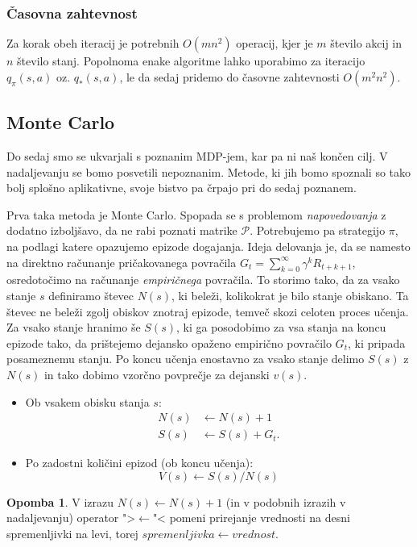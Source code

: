 \documentclass[12pt,a4paper]{amsart}
\theoremstyle{definition} %
\newtheorem{opomba}[definicija]{Opomba}
\theoremstyle{plain} %
\begin{document}
\subsubsection{Časovna zahtevnost}
Za korak obeh iteracij je potrebnih $O(mn^2)$ operacij, kjer je $m$ število akcij in $n$ število 
stanj. Popolnoma enake algoritme lahko uporabimo za iteracijo $q_\pi(s, a)$ oz. $q_*(s, a)$, le 
da sedaj pridemo do časovne zahtevnosti $O(m^2n^2)$.

\subsection{Monte Carlo}
Do sedaj smo se ukvarjali s poznanim MDP-jem, kar pa ni naš končen cilj. V nadaljevanju se bomo 
posvetili nepoznanim. Metode, ki jih bomo spoznali so tako bolj splošno aplikativne, svoje 
bistvo pa črpajo pri do sedaj poznanem.

Prva taka metoda je Monte Carlo. Spopada se s problemom \textit{napovedovanja} z dodatno izboljšavo, 
da ne rabi poznati matrike $\mathcal{P}$. Potrebujemo pa strategijo $\pi$, na podlagi katere opazujemo
epizode dogajanja. Ideja delovanja je, da se namesto na direktno računanje pričakovanega povračila
$G_t = \sum_{k=0}^\infty \gamma^k R_{t + k + 1}$, osredotočimo na računanje \textit{empiričnega} 
povračila. To storimo tako, da za vsako stanje $s$ definiramo števec $N(s)$, ki beleži, kolikokrat 
je bilo stanje obiskano. Ta števec ne beleži zgolj obiskov znotraj epizode, temveč skozi celoten 
proces učenja. Za vsako stanje hranimo še $S(s)$, ki ga posodobimo za vsa stanja na koncu epizode
tako, da prištejemo dejansko opaženo empirično povračilo $G_t$, ki pripada posameznemu stanju.
Po koncu učenja enostavno za vsako stanje delimo $S(s)$ z $N(s)$ in tako dobimo vzorčno povprečje za 
dejanski $v(s)$.
\begin{itemize}
    \item Ob vsakem obisku stanja $s$: 
        \begin{align*}
            N(s) &\leftarrow N(s) + 1 \\
            S(s) &\leftarrow S(s) + G_t.
        \end{align*}
    \item Po zadostni količini epizod (ob koncu učenja): 
        $$
        V(s) \leftarrow S(s) / N(s)
        $$
\end{itemize}

\begin{opomba}
    V izrazu $N(s) \leftarrow N(s) + 1$ (in v podobnih izrazih v nadaljevanju) operator ">$\leftarrow$"<
    pomeni prirejanje vrednosti na desni spremenljivki na levi, torej $spremenljivka \leftarrow vrednost$.
\end{opomba}
\end{document}
